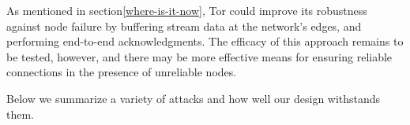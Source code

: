 \documentclass[times,10pt,twocolumn]{article}
\begin{document}
%
As mentioned in section\ref{where-is-it-now}, Tor could improve its
robustness against node failure by buffering stream data at the
network's edges, and performing end-to-end acknowledgments.  The
efficacy of this approach remains to be tested, however, and there
may be more effective means for ensuring reliable connections in the
presence of unreliable nodes.

%



\label{sec:attacks}

Below we summarize a variety of attacks and how well our design withstands
them.
\end{document}
